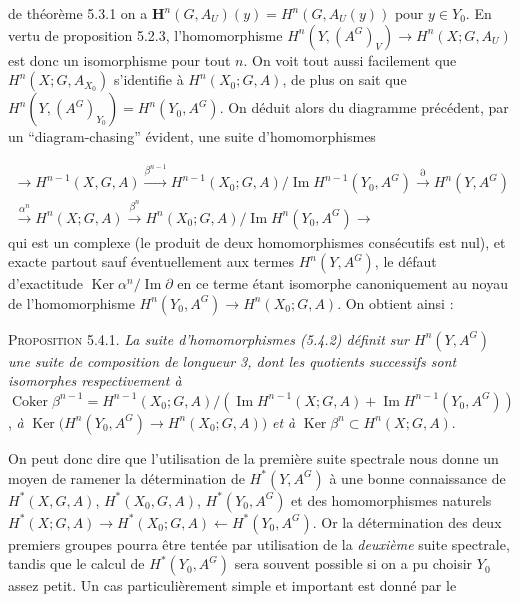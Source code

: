 \clearpage
{}

\noindent de théorème 5.3.1 on a
$\mathbf H^n(G,A_U)(y)=H^n(G,A_U(y))$ pour $y\in Y_0$. En vertu de
proposition 5.2.3, l'homomorphisme
$H^n(Y,(A^G)_V)\to H^n(X;G,A_U)$ est donc un isomorphisme pour
tout $n$. On voit tout aussi facilement que $H^n(X;G,A_{X_0})$ s'identifie à
$H^n(X_0;G,A)$, de plus on sait que
$H^n(Y,(A^G)_{Y_0})=H^n(Y_0,A^G)$. On déduit alors du diagramme précédent,
par un ``diagram-chasing'' évident, une suite d'homomorphismes

\[
\tag{5.4.2}
\begin{gathered}
{}\to H^{n-1}(X,G,A)
 \xrightarrow{\beta^{n-1}}
 H^{n-1}(X_0;G,A)/\operatorname{Im}H^{n-1}(Y_0,A^G)
 \xrightarrow{\partial} H^n(Y,A^G)\\[-0.2em]
 \xrightarrow{\alpha^n}H^n(X;G,A)
 \xrightarrow{\beta^n}
 H^n(X_0;G,A)/\operatorname{Im}H^n(Y_0,A^G)
 \to
\end{gathered}
\]
qui est un complexe (le produit de deux homomorphismes consécutifs est nul),
et exacte partout sauf éventuellement aux termes $H^n(Y,A^G)$, le défaut
d'exactitude $\operatorname{Ker}\alpha^n/\operatorname{Im}\partial$ en ce
terme étant isomorphe canoniquement au noyau de l'homomorphisme
$H^n(Y_0,A^G)\to H^n(X_0;G,A)$. On obtient ainsi :

\textsc{Proposition 5.4.1.} \textit{La suite d'homomorphismes \textup{(5.4.2)}
définit sur $H^n(Y,A^G)$ une suite de composition de longueur \textup{3}, dont les
quotients successifs sont isomorphes respectivement à}
$\operatorname{Coker}\beta^{n-1}=H^{n-1}(X_0;G,A)/(\operatorname{Im}H^{n-1}(X;G,A)+\operatorname{Im}H^{n-1}(Y_0,A^G))$,
\textit{à}
$\operatorname{Ker}\bigl(H^n(Y_0,A^G)\to H^n(X_0;G,A)\bigr)$
\textit{et à} $\operatorname{Ker}\beta^n\subset H^n(X;G,A)$.

On peut donc dire que l'utilisation de la première suite spectrale nous donne
un moyen de ramener la détermination de $H^*(Y,A^G)$ à une bonne connaissance
de $H^*(X,G,A)$, $H^*(X_0,G,A)$, $H^*(Y_0,A^G)$ et des homomorphismes naturels
$H^*(X;G,A)\to H^*(X_0;G,A)\leftarrow H^*(Y_0,A^G)$.
Or la détermination des deux premiers groupes pourra être tentée par
utilisation de la \textit{deuxième} suite spectrale, tandis que le calcul de
$H^*(Y_0,A^G)$ sera souvent possible si on a pu choisir $Y_0$ assez petit. Un
cas particulièrement simple et important est donné par le

